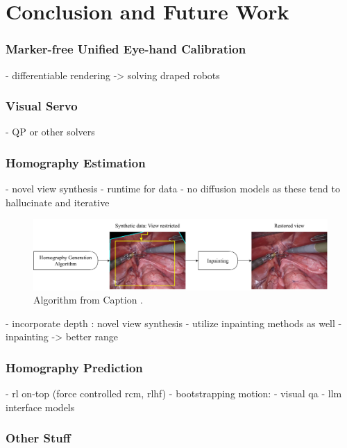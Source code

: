 \chapter[Conclusion and Future Work]{Conclusion and Future Work}
\label{chap:conclusion}
\minitoc

\subsection{Marker-free Unified Eye-hand Calibration}
- differentiable rendering -> solving draped robots

\subsection{Visual Servo}
- QP or other solvers

\subsection{Homography Estimation}
- novel view synthesis
    - runtime for data
    - no diffusion models \cite{rombach2022high} as these tend to hallucinate and iterative  
\begin{figure}
    \centering
    \includegraphics[width=\textwidth]{conclusion/fig/fourier_inpainting.pdf}
    \caption{Algorithm from   Caption \cite{suvorov2021resolution}.}
    \label{con:fig:inpainting}
\end{figure}
- incorporate depth \cite{budd2024transferring}: novel view synthesis
- utilize inpainting methods as well
- inpainting -> better range


\subsection{Homography Prediction}

- rl on-top (force controlled rcm, rlhf)
- bootstrapping motion:
    - visual qa
- llm interface models

\subsection{Other Stuff}



